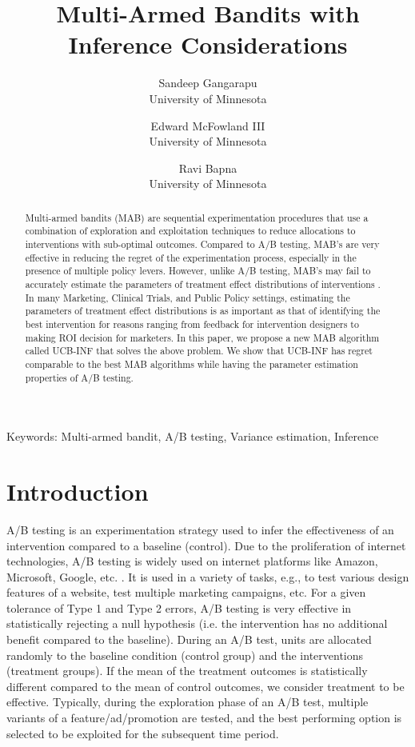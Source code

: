 \documentclass[12pt, letterpaper]{article}
\title{Multi-Armed Bandits with Inference Considerations}
\date{}
\author{Sandeep Gangarapu \\University of Minnesota \and Edward McFowland III \\University of Minnesota \and Ravi Bapna \\University of Minnesota}
\begin{document}
\maketitle

\begin{abstract}
Multi-armed bandits (MAB) are sequential experimentation procedures that use a combination of exploration and exploitation techniques to reduce allocations to interventions with sub-optimal outcomes. Compared to A/B testing, MAB's are very effective in reducing the regret of the experimentation process, especially in the presence of multiple policy levers. However, unlike A/B testing, MAB's may fail to accurately estimate the parameters of treatment effect distributions of interventions \citep{nie2017adaptively}. In many Marketing, Clinical Trials, and Public Policy settings, estimating the parameters of treatment effect distributions is as important as that of identifying the best intervention for reasons ranging from feedback for intervention designers to making ROI decision for marketers. In this paper, we propose a new MAB algorithm called UCB-INF that solves the above problem. We show that UCB-INF has regret comparable to the best MAB algorithms while having the parameter estimation properties of A/B testing. 
\end{abstract}

{Keywords: Multi-armed bandit, A/B testing, Variance estimation, Inference}

\section*{Introduction}
A/B testing is an experimentation strategy used to infer the effectiveness of an intervention compared to a baseline (control). Due to the proliferation of internet technologies, A/B testing is widely used on internet platforms like Amazon, Microsoft, Google, etc. \citep{kohavi2009controlled}. It is used in a variety of tasks, e.g., to test various design features of a website, test multiple marketing campaigns, etc. For a given tolerance of Type 1 and Type 2 errors, A/B testing is very effective in statistically rejecting a null hypothesis (i.e. the intervention has no additional benefit compared to the baseline). During an A/B test, units are allocated randomly to the baseline condition (control group) and the interventions (treatment groups). If the mean of the treatment outcomes is statistically different compared to the mean of control outcomes, we consider treatment to be effective.  Typically, during the exploration phase of an A/B test, multiple variants of a feature/ad/promotion are tested, and the best performing option is selected to be exploited for the subsequent time period.
\end{document}
